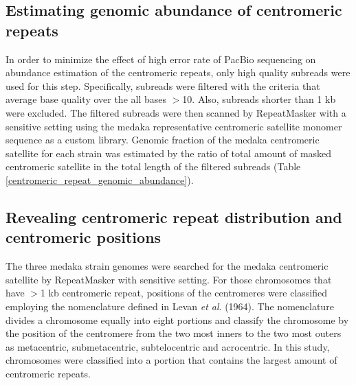 \subsection*{Estimating genomic abundance of centromeric repeats}
In order to minimize the effect of high error rate of PacBio sequencing on abundance estimation of the centromeric repeats, only high quality subreads were used for this step. Specifically, subreads were filtered with the criteria that average base quality over the all bases $>$10. Also, subreads shorter than 1 kb were excluded. The filtered subreads were then scanned by RepeatMasker with a sensitive setting using the medaka representative centromeric satellite monomer sequence as a custom library. Genomic fraction of the medaka centromeric satellite for each strain was estimated by the ratio of total amount of masked centromeric satellite in the total length of the filtered subreads (Table \ref{centromeric_repeat_genomic_abundance}).

\subsection*{Revealing centromeric repeat distribution and centromeric positions}
The three medaka strain genomes were searched for the medaka centromeric satellite by RepeatMasker with sensitive setting. For those chromosomes that have $>$1 kb centromeric repeat, positions of the centromeres were classified employing the nomenclature defined in Levan \textit{et al}. (1964). The nomenclature divides a chromosome equally into eight portions and classify the chromosome by the position of the centromere from the two most inners to the two most outers as metacentric, submetacentric, subtelocentric and acrocentric. In this study, chromosomes were classified into a portion that contains the largest amount of centromeric repeats.
